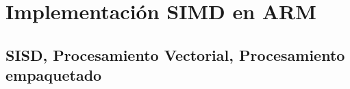 \section{Implementación SIMD en ARM}
\subsection{SISD, Procesamiento Vectorial, Procesamiento empaquetado}

